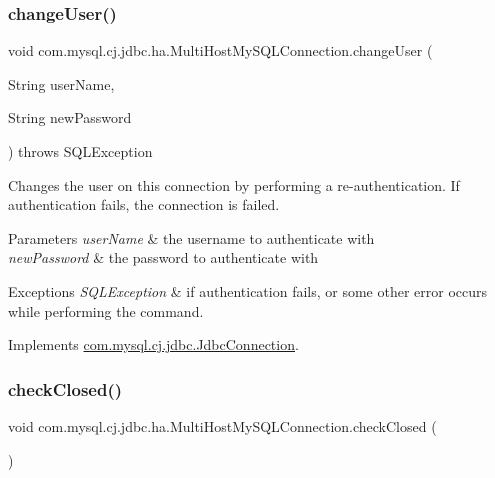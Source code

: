 \subsubsection{\texorpdfstring{change\+User()}{changeUser()}}
{\footnotesize\ttfamily void com.\+mysql.\+cj.\+jdbc.\+ha.\+Multi\+Host\+My\+S\+Q\+L\+Connection.\+change\+User (\begin{DoxyParamCaption}\item[{String}]{user\+Name,  }\item[{String}]{new\+Password }\end{DoxyParamCaption}) throws S\+Q\+L\+Exception}

Changes the user on this connection by performing a re-\/authentication. If authentication fails, the connection is failed.


\begin{DoxyParams}{Parameters}
{\em user\+Name} & the username to authenticate with \\
\hline
{\em new\+Password} & the password to authenticate with \\
\hline
\end{DoxyParams}

\begin{DoxyExceptions}{Exceptions}
{\em S\+Q\+L\+Exception} & if authentication fails, or some other error occurs while performing the command. \\
\hline
\end{DoxyExceptions}


Implements \mbox{\hyperlink{interfacecom_1_1mysql_1_1cj_1_1jdbc_1_1_jdbc_connection_aed0496e0f2c1236f2784f92b45a482ef}{com.\+mysql.\+cj.\+jdbc.\+Jdbc\+Connection}}.

\mbox{\label{classcom_1_1mysql_1_1cj_1_1jdbc_1_1ha_1_1_multi_host_my_s_q_l_connection_aaca35ad8d7fae96cb649f1f14f2dbc13}} 
\subsubsection{\texorpdfstring{check\+Closed()}{checkClosed()}}
{\footnotesize\ttfamily void com.\+mysql.\+cj.\+jdbc.\+ha.\+Multi\+Host\+My\+S\+Q\+L\+Connection.\+check\+Closed (\begin{DoxyParamCaption}{ }\end{DoxyParamCaption})}



